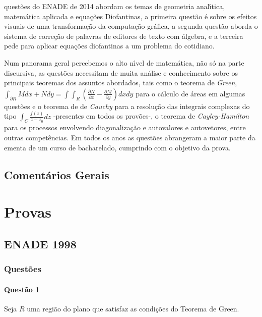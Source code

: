 \documentclass{report}
\begin{document}
quest\~oes do ENADE de 2014 abordam os temas de geometria anal\'\i tica, matem\'atica aplicada e equa\c c\~oes Diofantinas, a primeira quest\~ao \'e sobre os efeitos visuais de uma transforma\c c\~ao da computa\c c\~ao gr\'afica, a segunda quest\~ao aborda o sistema de corre\c c\~ao de palavras de editores de texto com \'algebra, e a terceira pede para aplicar equa\c c\~oes diofantinas a um problema do cotidiano.

Num panorama geral percebemos o alto n\'\i vel de matem\'atica, n\~ao s\'o na parte discursiva, as quest\~oes necessitam de muita an\'alise e conhecimento sobre os principais teoremas dos assuntos abordados, tais como o teorema de {\it Green}, $\displaystyle \int_{\partial R} M dx + N dy= \int\!\int_R \left( \frac{\partial N}{\partial x} - \frac{\partial M}{\partial y}\right) dx dy $ para o c\'alculo de \'areas em algumas quest\~oes e o teorema de de {\it Cauchy} para a resolu\c c\~ao das integrais complexas do tipo $\displaystyle \int_C \frac{f(z)}{z-z_0} dz$ -presentes em todos os prov\~oes-, o teorema de {\it Cayley-Hamilton} para os processos envolvendo diagonaliza\c c\~ao e autovalores e autovetores, entre outras compet\^encias. Em todos os anos as quest\~oes abrangeram a maior parte da ementa de um curso de bacharelado, cumprindo com o objetivo da prova.

\chapter{Coment\'arios Gerais}

\part{Provas}
 
\chapter{ENADE 1998}

\section{\color{blue} Quest\~oes}

\subsection{\color{blue} Quest\~ao 1}

Seja $R$ uma regi\~ao do plano que satisfaz as condi\c c\~oes do Teorema de Green.
\end{document}
